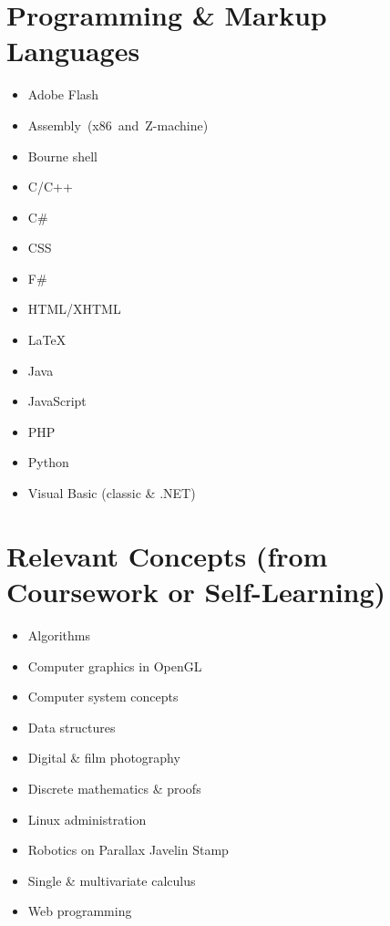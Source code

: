 \documentclass{simplecv}
\begin{document}
  \newpage

  \section{Programming \& Markup Languages}
  \begin{multicols}{2}
    \begin{itemize}
      \item Adobe Flash
      \item Assembly\ (x86\ and\ Z-machine)
      \item Bourne shell
      \item C/C++
      \item C\#
      \item CSS
      \item F\#
      \item HTML/XHTML
      \item \LaTeX{}
      \item Java
      \item JavaScript
      \item PHP
      \item Python
      \item Visual Basic (classic \& .NET)
    \end{itemize}
  \end{multicols}

  \section{Relevant Concepts (from Coursework or Self-Learning)}
  \begin{multicols}{2}
    \begin{itemize}
      \item Algorithms
      \item Computer graphics in OpenGL
      \item Computer system concepts
      \item Data structures
      \item Digital \& film photography
      \item Discrete mathematics \& proofs
      \item Linux administration
      \item Robotics on Parallax Javelin Stamp
      \item Single \& multivariate calculus
      \item Web programming
    \end{itemize}
  \end{multicols}
\end{document}
